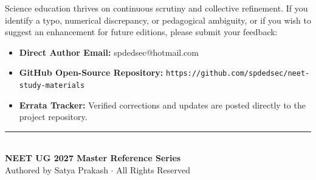 \documentclass[10pt,twoside,openright]{book}
\begin{document}
Science education thrives on continuous scrutiny and collective refinement. If you identify a typo, numerical discrepancy, or pedagogical ambiguity, or if you wish to suggest an enhancement for future editions, please submit your feedback:

\begin{itemize}
  \item \textbf{Direct Author Email:} spdedsec@hotmail.com
  \item \textbf{GitHub Open-Source Repository:} \nolinkurl{https://github.com/spdedsec/neet-study-materials}
  \item \textbf{Errata Tracker:} Verified corrections and updates are posted directly to the project repository.
\end{itemize}

\vspace{1.5cm}
\begin{center}
  \rule{0.6\textwidth}{0.6pt}\\[6pt]
  {\small\textbf{\color{primarydark}NEET UG 2027 Master Reference Series}}\\[2pt]
  {\footnotesize\color{gray}Authored by Satya Prakash $\cdot$ All Rights Reserved}
\end{center}
\end{document}
